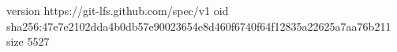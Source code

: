 version https://git-lfs.github.com/spec/v1
oid sha256:47e7e2102dda4b0db57e90023654e8d460f6740f64f12835a22625a7aa76b211
size 5527
